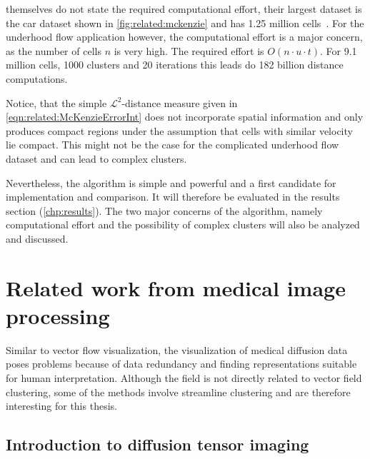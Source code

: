  themselves do not state the required	 computational effort, their largest \threed dataset is the car dataset shown in \autoref{fig:related:mckenzie} and has \num{1.25} million cells~\cite{McKenzie}. For the underhood flow application however, the computational effort is a major concern, as the number of cells $n$ is very high. The required effort is $O(n \cdot u \cdot t)$. For \num{9.1} million cells, \num{1000} clusters and \num{20} iterations this leads do \num{182} billion distance computations.

Notice, that the simple $\mathcal{L}^2$-distance measure given in \autoref{eqn:related:McKenzieErrorInt} does not incorporate spatial information and only produces compact regions under the assumption that cells with similar velocity lie compact. This might not be the case for the complicated underhood flow dataset and can lead to complex clusters.

Nevertheless, the algorithm is simple and powerful and a first candidate for implementation and comparison. It will therefore be evaluated in the results section (\autoref{chp:results}). The two major concerns of the algorithm, namely computational effort and the possibility of complex clusters will also be analyzed and discussed.


\section{Related work from medical image processing}
\label{sec:related:medical}

Similar to vector flow visualization, the visualization of medical diffusion data poses problems because of data redundancy and finding representations suitable for human interpretation. Although the field is not directly related to vector field clustering, some of the methods involve streamline clustering and are therefore interesting for this thesis.


\subsection{Introduction to diffusion tensor imaging}

